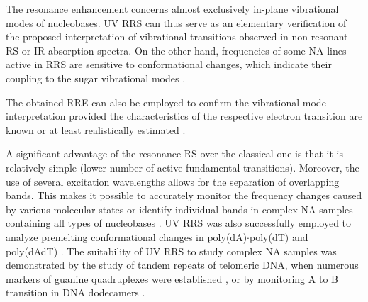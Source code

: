 The resonance enhancement concerns almost exclusively in-plane vibrational
modes of nucleobases.
UV RRS can thus serve as an elementary verification of the proposed
interpretation of vibrational transitions observed in non-resonant RS or IR
absorption spectra.
On the other hand, frequencies of some NA lines active in RRS are sensitive to
conformational changes, which indicate their coupling to the sugar vibrational
modes
\parencite{Nishimura1987}.

The obtained RRE can also be employed to confirm the vibrational mode
interpretation provided the characteristics of the respective electron
transition are known or at least realistically estimated
\parencite{Fodor1985}.

A significant advantage of the resonance RS over the classical one is that it
is relatively simple (lower number of active fundamental transitions).
Moreover, the use of several excitation wavelengths allows for the separation
of overlapping bands.
This makes it possible to accurately monitor the frequency changes caused by
various molecular states or identify individual bands in complex NA samples
containing all types of nucleobases
\parencite{Mukerji1995}.
UV RRS was also successfully employed to analyze premelting conformational
changes in poly(dA)$\cdot$poly(dT) and poly(dAdT)
\parencite{Chan1997}.
The suitability of UV RRS to study complex NA samples was demonstrated by the
study of tandem repeats of telomeric DNA, when numerous markers of guanine
quadruplexes were established
\parencite{Krafft2002},
or by monitoring A to B transition in DNA dodecamers
\parencite{Knee2008}.
